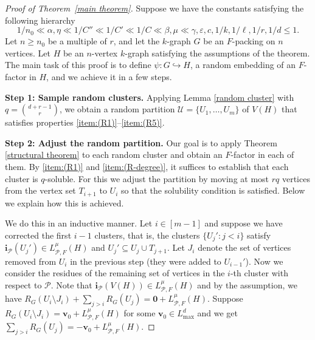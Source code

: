 \documentclass[11pt, letterpaper]{amsart}
\theoremstyle{plain}
\numberwithin{equation}{section}
\theoremstyle{definition}
\renewcommand{\vec}[1]{{\mathbf #1}}
\begin{document}
     \begin{proof}[Proof of Theorem~\ref{main theorem}]
     
         Suppose we have the constants satisfying the following hierarchy
         \[1/n_0\ll \alpha,\eta\ll 1/C'' \ll1/C'\ll 1/C\ll \beta,\mu\ll \gamma,\varepsilon,c,1/k,1/\ell,1/r,1/d\le 1.\]
         Let $n\ge n_0$ be a multiple of $r$, and
         let the $k$-graph $G$ be an $F$-packing on $n$ vertices.
         Let $H$ be an $n$-vertex $k$-graph satisfying the assumptions of the theorem.
         The main task of this proof is to define $\psi:G\hookrightarrow H$, a random embedding of an $F$-factor in $H$, and we achieve it in a few steps.

         \medskip
         \textbf{Step 1: Sample random clusters.} Applying Lemma \ref{random cluster} with $q=\binom{d+r-1}{r}$, we obtain a random partition $\mathcal{U}=\{U_1,\dots,U_m\}$ of $V(H)$ that satisfies properties \ref{item:(R1)}--\ref{item:(R5)}.
         
         \medskip
         \textbf{Step 2: Adjust the random partition.} 
Our goal is to apply Theorem \ref{structural theorem} to each random cluster and obtain an $F$-factor in each of them.
By \ref{item:(R1)} and \ref{item:(R-degree)}, it suffices to establish that each cluster is $q$-soluble.
For this we adjust the partition by moving at most $rq$ vertices from the vertex set $T_{i+1}$ to $U_i$ so that the solubility condition is satisfied.
Below we explain how this is achieved.

We do this in an inductive manner.
Let $i\in[m-1]$ and suppose we have corrected the first $i-1$ clusters, that is, the clusters $\{U_j':j<i\}$ satisfy $\vec{i}_{\mathcal{P}}(U_j')\in L_{\mathcal{P},F}^{\mu}(H)$ and $U_j'\subseteq U_j\cup T_{j+1}$.
Let $J_i$ denote the set of vertices removed from $U_i$ in the previous step (they were added to $U_{i-1}'$). 
Now we consider the residues of the remaining set of vertices in the $i$-th cluster with respect to $\mathcal{P}$. 
Note that $ \vec{i}_{\mathcal{P}}(V(H))\in L_{\mathcal{P},F}^{\mu}(H) $ and by the assumption, we have $ R_G(U_{i}\setminus J_i)+\sum_{j> i}R_G(U_{j})=\vec{0}+L_{\mathcal{P},F}^{\mu}(H) $. Suppose $ R_G(U_{i}\setminus J_i)=\vec{v_0}+L_{\mathcal{P},F}^{\mu}(H) $ for some $\vec{v_0}\in L_{\max}^d$ and we get $ \sum_{j> i}R_G(U_{j})=-\vec{v_0}+L_{\mathcal{P},F}^{\mu}(H) $.


\end{proof}
\end{document}
